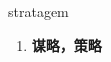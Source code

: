 
\begin{frame}
{\huge stratagem}
\begin{center}
\begin{enumerate}\Large
  \item \textbf{谋略，策略}
\end{enumerate}
\end{center}
\end{frame}
